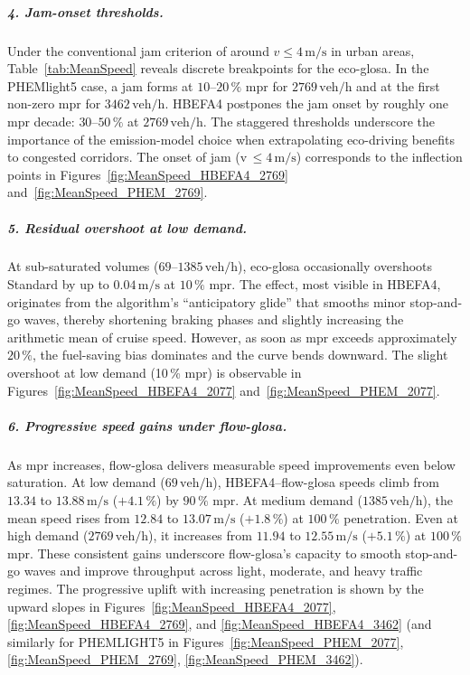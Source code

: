 \subparagraph*{4. Jam-onset thresholds.}
Under the conventional jam criterion of around $v \leq 4\,\mathrm{m/s}$ in urban areas, Table~\ref{tab:MeanSpeed} reveals discrete breakpoints for the \ac{eco-glosa}. In the PHEMlight5 case, a jam forms at $10$--$20\,\%$ \ac{mpr} for $2769\,\mathrm{veh/h}$ and at the first non-zero \ac{mpr} for $3462\,\mathrm{veh/h}$. HBEFA4 postpones the jam onset by roughly one \ac{mpr} decade: $30$--$50\,\%$ at $2769\,\mathrm{veh/h}$. The staggered thresholds underscore the importance of the emission-model choice when extrapolating eco-driving benefits to congested corridors. The onset of jam (v\,$\le4\,\mathrm{m/s}$) corresponds to the inflection points in Figures~\ref{fig:MeanSpeed_HBEFA4_2769} and~\ref{fig:MeanSpeed_PHEM_2769}.

\subparagraph*{5. Residual overshoot at low demand.}
At sub-saturated volumes ($69$--$1385\,\mathrm{veh/h}$), \ac{eco-glosa} occasionally overshoots Standard by up to $0.04\,\mathrm{m/s}$ at $10\,\%$ \ac{mpr}. The effect, most visible in HBEFA4, originates from the algorithm's \enquote{anticipatory glide} that smooths minor stop-and-go waves, thereby shortening braking phases and slightly increasing the arithmetic mean of cruise speed. However, as soon as \ac{mpr} exceeds approximately $20\,\%$, the fuel-saving bias dominates and the curve bends downward. The slight overshoot at low demand (10\,\% \ac{mpr}) is observable in Figures~\ref{fig:MeanSpeed_HBEFA4_2077} and~\ref{fig:MeanSpeed_PHEM_2077}.

\subparagraph*{6. Progressive speed gains under \ac{flow-glosa}.}
As \ac{mpr} increases, \ac{flow-glosa} delivers measurable speed improvements even below saturation. At low demand ($69\,\mathrm{veh/h}$), HBEFA4–\ac{flow-glosa} speeds climb from $\mathbf{13.34}$ to $13.88\,\mathrm{m/s}$ ($+4.1\,\%$) by $90\,\%$ \ac{mpr}. At medium demand ($1385\,\mathrm{veh/h}$), the mean speed rises from $\mathbf{12.84}$ to $13.07\,\mathrm{m/s}$ ($+1.8\,\%$) at $100\,\%$ penetration. Even at high demand ($2769\,\mathrm{veh/h}$), it increases from $\mathbf{11.94}$ to $12.55\,\mathrm{m/s}$ ($+5.1\,\%$) at $100\,\%$ \ac{mpr}. These consistent gains underscore \ac{flow-glosa}’s capacity to smooth stop-and-go waves and improve throughput across light, moderate, and heavy traffic regimes. The progressive uplift with increasing penetration is shown by the upward slopes in Figures~\ref{fig:MeanSpeed_HBEFA4_2077}, \ref{fig:MeanSpeed_HBEFA4_2769}, and \ref{fig:MeanSpeed_HBEFA4_3462} (and similarly for PHEMLIGHT5 in Figures~\ref{fig:MeanSpeed_PHEM_2077}, \ref{fig:MeanSpeed_PHEM_2769}, \ref{fig:MeanSpeed_PHEM_3462}).

